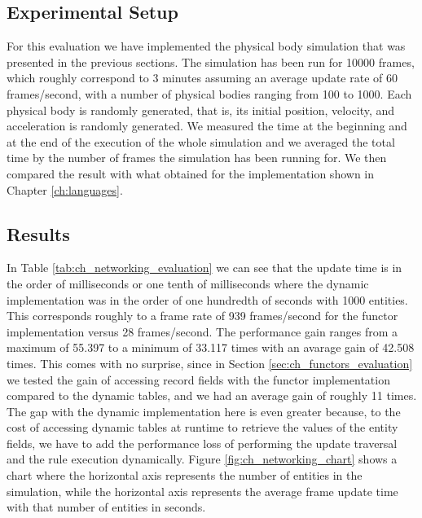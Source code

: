 \subsection{Experimental Setup}
For this evaluation we have implemented the physical body simulation that was presented in the previous sections. The simulation has been run for 10000 frames, which roughly correspond to 3 minutes assuming an average update rate of 60 frames/second, with a number of physical bodies ranging from 100 to 1000. Each physical body is randomly generated, that is, its initial position, velocity, and acceleration is randomly generated. We measured the time at the beginning and at the end of the execution of the whole simulation and we averaged the total time by the number of frames the simulation has been running for. We then compared the result with what obtained for the implementation shown in Chapter \ref{ch:languages}.

\subsection{Results}
In Table \ref{tab:ch_networking_evaluation} we can see that the update time is in the order of milliseconds or one tenth of milliseconds where the dynamic implementation was in the order of one hundredth of seconds with 1000 entities. This corresponds roughly to a frame rate of 939 frames/second for the functor implementation versus 28 frames/second. The performance gain ranges from a maximum of 55.397 to a minimum of 33.117 times with an avarage gain of 42.508 times. This comes with no surprise, since in Section \ref{sec:ch_functors_evaluation} we tested the gain of accessing record fields with the functor implementation compared to the dynamic tables, and we had an average gain of roughly 11 times. The gap with the dynamic implementation here is even greater because, to the cost of accessing dynamic tables at runtime to retrieve the values of the entity fields, we have to add the performance loss of performing the update traversal and the rule execution dynamically. Figure \ref{fig:ch_networking_chart} shows a chart where the horizontal axis represents the number of entities in the simulation, while the horizontal axis represents the average frame update time with that number of entities in seconds.

